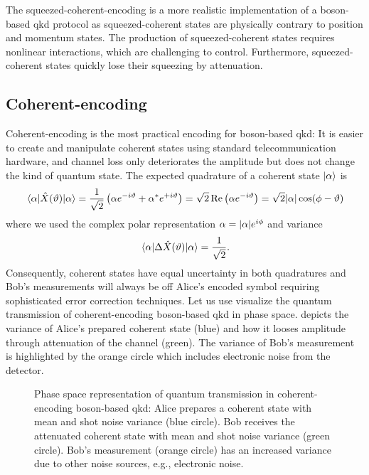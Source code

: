 The squeezed-coherent-encoding is a more realistic implementation of a boson-based \gls{qkd} protocol as squeezed-coherent states are physically contrary to position and momentum states.
The production of squeezed-coherent states requires nonlinear interactions, which are challenging to control.
Furthermore, squeezed-coherent states quickly lose their squeezing by attenuation.

\FloatBarrier
\subsection{Coherent-encoding}

Coherent-encoding is the most practical encoding for boson-based \gls{qkd}:
It is easier to create and manipulate coherent states using standard telecommunication hardware, and channel loss only deteriorates the amplitude but does not change the kind of quantum state.
The expected quadrature of a coherent state $\ket{\alpha}$ is
\begin{equation}
	\expval{\hat{X}(\vartheta)}{\alpha}
	=
	\frac{1}{\sqrt{2}}
	\left(
		\alpha
		e^{-i\vartheta}
		+
		\alpha^*
		e^{+i\vartheta}
	\right)
	=
	\sqrt{2}
	\operatorname{\operatorname{Re}}\left(
		\alpha
		e^{-i\vartheta}
	\right)
	=
	\sqrt{2}
	\abs{\alpha}
	\cos(\phi-\vartheta)
\end{equation}
where we used the complex polar representation $\alpha=\abs{\alpha}e^{i\phi}$ and variance~\cite[p.~59]{Barnett2002}
\begin{equation}
	\expval{\Delta\hat{X}(\vartheta)}{\alpha}
	=
	\frac{1}{\sqrt{2}}
	.
\end{equation}
Consequently, coherent states have equal uncertainty in both quadratures and Bob's measurements will always be off Alice's encoded symbol requiring sophisticated error correction techniques.
Let us use visualize the quantum transmission of coherent-encoding boson-based \gls{qkd} in phase space.
 depicts the variance of Alice's prepared coherent state (blue) and how it looses amplitude through attenuation of the channel (green).
The variance of Bob's measurement is highlighted by the orange circle which includes electronic noise from the detector.
\begin{figure}[htb]
	\centering
	
	\caption{Phase space representation of quantum transmission in coherent-encoding boson-based \gls{qkd}: Alice prepares a coherent state with mean and shot noise variance (blue circle). Bob receives the attenuated coherent state with mean and shot noise variance (green circle). Bob's measurement (orange circle) has an increased variance due to other noise sources, e.g., electronic noise.}\label{fig:phase_space_coherent}
\end{figure}
